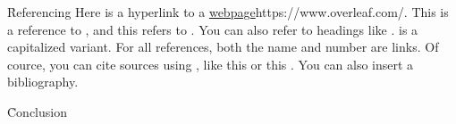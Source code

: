 \documentclass{ieee}
\begin{document}

\h{Referencing}
Here is a hyperlink to a \url{webpage}{https://www.overleaf.com/}. This is a reference to , and this refers to . You can also refer to headings like .  is a capitalized variant. For all references, both the name and number are links. Of cource, you can cite sources using \c{\cite{...}}, like this \cite{minted} or this \cite{tabularray}. You can also insert a bibliography.

\h{Conclusion}

\toc %

\end{document}
